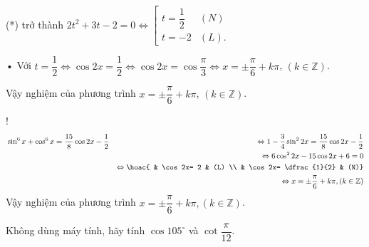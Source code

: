\begin{bt}
{\begin{listEX}[2]
			(*) trở thành $ 2t^2 + 3t - 2 = 0 \Leftrightarrow 
			\left[\begin{array}{lr}
				t = \dfrac{1}{2}& (N)\\
				t =  - 2& (L).
			\end{array} \right.$
			
			• Với $t=\dfrac{1}{2}\Leftrightarrow 
			\cos 2x=\dfrac{1}{2}\Leftrightarrow 
			\cos 2x=\cos \dfrac{\pi}{3}\Leftrightarrow 
			x=\pm \dfrac{\pi}{6}+k\pi $, $( k\in \mathbb{Z})$.
			
			Vậy nghiệm của phương trình $x=\pm \dfrac{\pi}{6}+k\pi$, $( k\in \mathbb{Z})$.
			\item! 
			\begin{eqnarray*}
				&\sin^6x + \cos^6x = \dfrac{15}{8} \cos 2x - \dfrac{1}{2}
				&\Leftrightarrow 1-\dfrac{3}{4}\sin^22x= \dfrac{15}{8} \cos 2x - \dfrac{1}{2}\\
				&&\Leftrightarrow 6\cos^2 2x-15\cos 2x+6=0\\
				&&\Leftrightarrow 
				\hoac{ & \cos 2x= 2 & (L) \\ & \cos 2x= \dfrac{1}{2} & (N)}\\
				&&\Leftrightarrow x=\pm \dfrac{\pi}{6}+k\pi, (k\in \mathbb{Z})
			\end{eqnarray*}
			Vậy nghiệm của phương trình  
			$  x=\pm \dfrac{\pi}{6}+k\pi, (k\in \mathbb{Z})$. 
		\end{listEX}
	}
\end{bt}

\begin{vd}[NB]%
	Không dùng máy tính, hãy tính $\cos 105^{\circ}$ và $\cot\dfrac{\pi}{12}$.
\end{vd}

